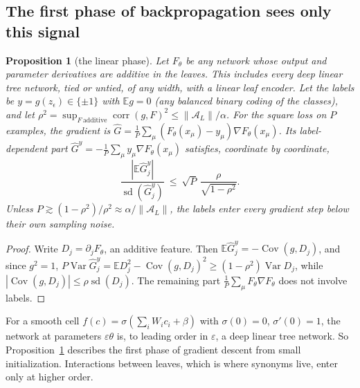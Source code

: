\documentclass[11pt]{article}
\newtheorem{proposition}[theorem]{Proposition}
\theoremstyle{definition}
\newcommand{\E}{\mathbb{E}}
\newcommand{\Var}{\operatorname{Var}}
\newcommand{\norm}[1]{\lVert #1\rVert}
\newcommand{\Cov}{\operatorname{Cov}}
\begin{document}
\subsection{The first phase of backpropagation sees only this signal}
\begin{proposition}[the linear phase]\label{prop:linphase}
Let $F_\theta$ be any network whose output and parameter derivatives are additive in the leaves. This
includes every deep \emph{linear} tree network, tied or untied, of any width, with a linear leaf
encoder. Let the labels be $y=g(z_\epsilon)\in\{\pm1\}$ with $\E g=0$ (any balanced binary coding of
the classes), and let $\rho^2=\sup_{F\ \mathrm{additive}}\operatorname{corr}(g,F)^2\le\norm{\mathcal A_L}/\alpha$.
For the square loss on $P$ examples, the gradient is
$\hat G=\frac1P\sum_\mu(F_\theta(x_\mu)-y_\mu)\nabla F_\theta(x_\mu)$. Its label-dependent part
$\hat G^y=-\frac1P\sum_\mu y_\mu\nabla F_\theta(x_\mu)$ satisfies, coordinate by coordinate,
\[
\frac{|\E\hat G^y_j|}{\operatorname{sd}(\hat G^y_j)}\ \le\ \sqrt P\,\frac{\rho}{\sqrt{1-\rho^2}} .
\]
Unless $P\gtrsim(1-\rho^2)/\rho^2\approx\alpha/\norm{\mathcal A_L}$, the labels enter every gradient
step below their own sampling noise.
\end{proposition}
\begin{proof}
Write $D_j=\partial_jF_\theta$, an additive feature. Then $\E\hat G^y_j=-\Cov(g,D_j)$, and since $g^2=1$,
$P\Var\hat G^y_j=\E D_j^2-\Cov(g,D_j)^2\ge(1-\rho^2)\Var D_j$, while $|\Cov(g,D_j)|\le\rho\operatorname{sd}(D_j)$.
The remaining part $\frac1P\sum_\mu F_\theta\nabla F_\theta$ does not involve labels.
\end{proof}
\noindent For a smooth cell $f(c)=\sigma(\sum_iW_ic_i+\beta)$ with $\sigma(0)=0$, $\sigma'(0)=1$, the network at
parameters $\varepsilon\theta$ is, to leading order in $\varepsilon$, a deep linear tree network. So
Proposition~\ref{prop:linphase} describes the first phase of gradient descent from small
initialization. Interactions between leaves, which is where synonyms live, enter only at higher
order.
\end{document}
